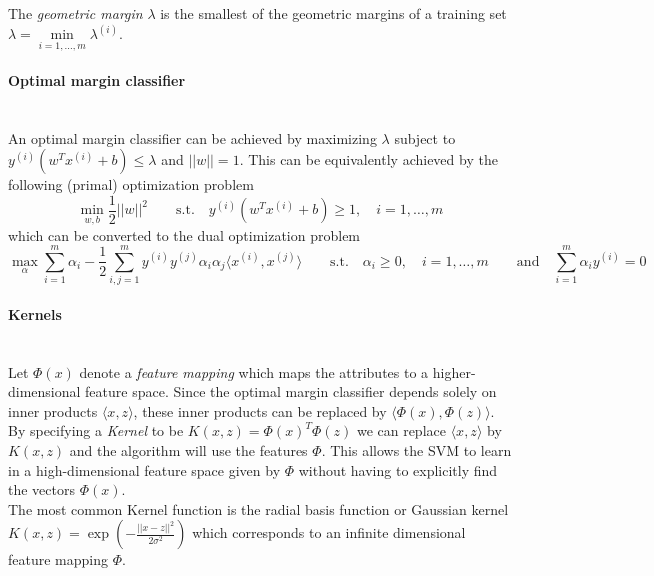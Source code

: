     The \emph{geometric margin} $\lambda$ is the smallest of the geometric margins of a training set $\lambda = \min\limits_{i=1,\ldots,m}\lambda^{(i)}$.
    
    \paragraph{Optimal margin classifier}~\\
    An optimal margin classifier can be achieved by maximizing $\lambda$ subject to $y^{(i)}(w^T x^{(i)}+b)\leq\lambda$ and $||w||=1$.
    This can be equivalently achieved by the following (primal) optimization problem
    \begin{equation*}
        \min_{w,b} \frac{1}{2} ||w||^2 \qquad \text{s.t.} \quad y^{(i)}(w^T x^{(i)} + b) \geq 1, \quad i=1,\ldots,m
    \end{equation*}
    which can be converted to the dual optimization problem
    \begin{equation*}
        \max_{\alpha} \sum\limits_{i=1}^m \alpha_i - \frac{1}{2}\sum\limits_{i,j=1}^m y^{(i)}y^{(j)}\alpha_i\alpha_j \langle x^{(i)},x^{(j)} \rangle
        \qquad \text{s.t.} \quad \alpha_i \geq 0, \quad i=1,\ldots,m \qquad \text{and} \quad \sum\limits_{i=1}^m \alpha_i y^{(i)}=0
    \end{equation*}
    
    \paragraph{Kernels}~\\
    Let $\Phi(x)$ denote a \emph{feature mapping} which maps the attributes to a higher-dimensional feature space.
    Since the optimal margin classifier depends solely on inner products $\langle x,z \rangle$, 
    these inner products can be replaced by $\langle \Phi(x),\Phi(z) \rangle$. 
    By specifying a \emph{Kernel} to be $K(x,z) = \Phi(x)^T \Phi(z)$ we can replace $\langle x,z \rangle$ by $K(x,z)$ and the algorithm will use the features $\Phi$.
    This allows the SVM to learn in a high-dimensional feature space given by $\Phi$ without having to explicitly find the vectors $\Phi(x)$. \\
    
    The most common Kernel function is the radial basis function or Gaussian kernel 
    $K(x,z) = \exp\left(-\frac{||x-z||^2}{2 \sigma^2}\right)$
    which corresponds to an infinite dimensional feature mapping $\Phi$.  \\
    
